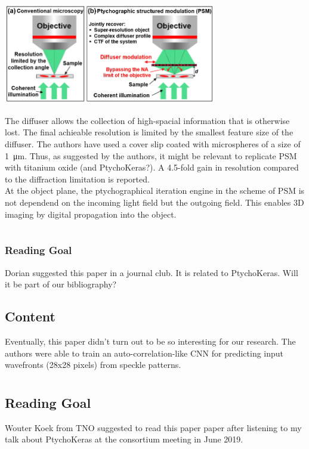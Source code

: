 \documentclass{article}
\newcommand{\newcite}[1] {\section{\cite{#1} \citenum{#1}}}
\begin{document}
\begin{center}
    \includegraphics[width=0.7\textwidth]{figures/PSM.png}
\end{center}
The diffuser allows the collection of high-spacial information that is otherwise lost. The final achieable resolution is limited by the smallest feature size of the diffuser. The authors have used a cover slip coated with microspheres of a size of \SI{1}{\micro\metre}. Thus, as suggested by the authors, it might be relevant to replicate PSM with titanium oxide (and PtychoKeras?).
A 4.5-fold gain in resolution compared to the diffraction limitation is reported.\\
At the object plane, the ptychographical iteration engine in the scheme of PSM is not dependend on the incoming light field but the outgoing field. This enables 3D imaging by digital propagation into the object.

\newcite{Li2018-lc}
\subsubsection*{Reading Goal}

Dorian suggested this paper in a journal club.
It is related to PtychoKeras. Will it be part of our bibliography?

\subsection*{Content}
Eventually, this paper didn't turn out to be so interesting for our research. The authors were able to train an auto-correlation-like CNN for predicting input wavefronts (28x28 pixels) from speckle patterns. 

\newcite{Kellman2018-uj}
\subsection*{Reading Goal}

Wouter Koek from TNO suggested to read this paper paper after listening to my talk about PtychoKeras at the consortium meeting in June 2019.
\end{document}
